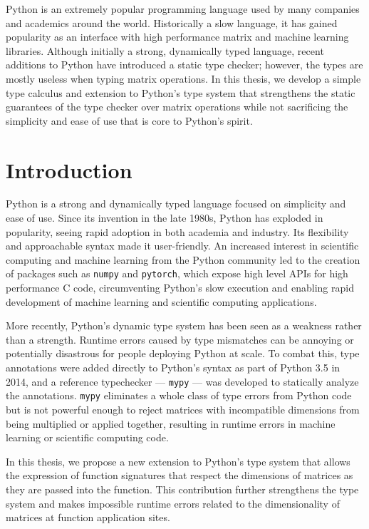 \documentclass{book}
\begin{document}
\tableofcontents
\newpage

    Python is an extremely popular programming language used by many companies and academics around the world. Historically a slow language, it has gained popularity as an interface with high performance matrix and machine learning libraries. Although initially a strong, dynamically typed language, recent additions to Python have introduced a static type checker; however, the types are mostly useless when typing matrix operations. In this thesis, we develop a simple type calculus and extension to Python's type system that strengthens the static guarantees of the type checker over matrix operations while not sacrificing the simplicity and ease of use that is core to Python's spirit.

\section{Introduction}

Python is a strong and dynamically typed language focused on simplicity and ease of use. Since its invention in the late 1980s, Python has exploded in popularity, seeing rapid adoption in both academia and industry. Its flexibility and approachable syntax made it user-friendly. An increased interest in scientific computing and machine learning from the Python community led to the creation of packages such as \texttt{numpy} and \texttt{pytorch}, which expose high level APIs for high performance C code, circumventing Python's slow execution and enabling rapid development of machine learning and scientific computing applications.

More recently, Python's dynamic type system has been seen as a weakness rather than a strength. Runtime errors caused by type mismatches can be annoying or potentially disastrous for people deploying Python at scale. To combat this, type annotations were added directly to Python's syntax as part of Python 3.5 in 2014, and a reference typechecker --- \texttt{mypy} --- was developed to statically analyze the annotations. \texttt{mypy} eliminates a whole class of type errors from Python code but is not powerful enough to reject matrices with incompatible dimensions from being multiplied or applied together, resulting in runtime errors in machine learning or scientific computing code.

In this thesis, we propose a new extension to Python's type system that allows the expression of function signatures that respect the dimensions of matrices as they are passed into the function. This contribution further strengthens the type system and makes impossible runtime errors related to the dimensionality of matrices at function application sites.
\end{document}
